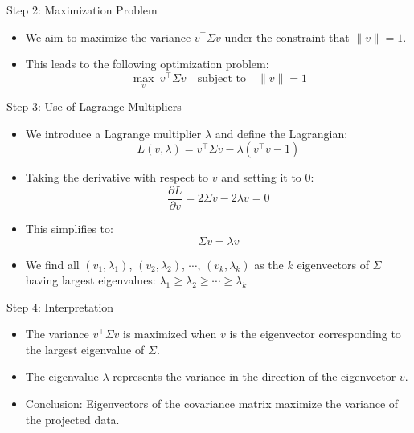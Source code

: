 \documentclass[serif, aspectratio=169]{beamer}
\begin{document}
\begin{frame}{Step 2: Maximization Problem}
    \begin{itemize}
        \item We aim to maximize the variance \( v^\top \Sigma v \) under the constraint that \( \|v\| = 1 \).
        \item This leads to the following optimization problem:
        \[
        \max_{v} \ v^\top \Sigma v \quad \text{subject to} \quad \|v\| = 1
        \]
    \end{itemize}
\end{frame}

\begin{frame}{Step 3: Use of Lagrange Multipliers}
    \begin{itemize}
        \item We introduce a Lagrange multiplier \( \lambda \) and define the Lagrangian:
        \[
        L(v, \lambda) = v^\top \Sigma v - \lambda (v^\top v - 1)
        \]
        \item Taking the derivative with respect to \( v \) and setting it to 0:
        \[
        \frac{\partial L}{\partial v} = 2 \Sigma v - 2 \lambda v = 0
        \]
        \item This simplifies to:
        \[
        \Sigma v = \lambda v
        \]
        \item We find all $(v_1, \lambda_1)$, $(v_2, \lambda_2)$, $\cdots$, $(v_k, \lambda_k)$ as the $k$ eigenvectors of $\Sigma$ having largest eigenvalues: $\lambda_1 \geq \lambda_2 \geq \cdots \geq \lambda_k$ 
    \end{itemize}
\end{frame}

\begin{frame}{Step 4: Interpretation}
    \begin{itemize}
        \item The variance \( v^\top \Sigma v \) is maximized when \( v \) is the eigenvector corresponding to the largest eigenvalue of \( \Sigma \).
        \item The eigenvalue \( \lambda \) represents the variance in the direction of the eigenvector \( v \).
        \item Conclusion: Eigenvectors of the covariance matrix maximize the variance of the projected data.
    \end{itemize}
\end{frame}
\end{document}
